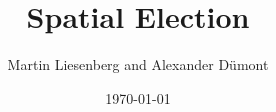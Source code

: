 \documentclass[a4paper,10pt]{article}
\begin{document}
\title{Spatial Election}
\author{Martin Liesenberg and Alexander D\"umont}
\date{\today}
\maketitle

\newpage
\setcounter{tocdepth}{2}
\tableofcontents

\newpage



















\end{document}
